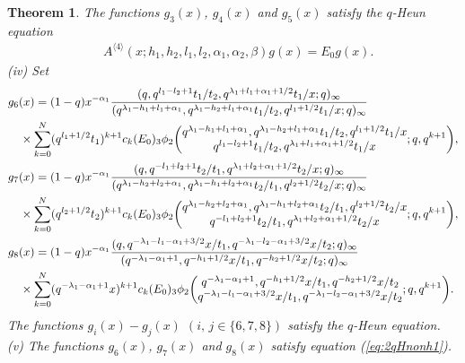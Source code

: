 \documentclass[12pt]{amsart}
\numberwithin{equation}{section}
\newtheorem{thm}{Theorem}[section]
\theoremstyle{definition}
\theoremstyle{remark}
\begin{document}
\begin{thm}
The functions $g_3(x)$,  $g_4(x)$ and $g_5(x)$ satisfy the $q$-Heun equation
  \begin{align*}
    & A^{\langle 4 \rangle} (x; h_{1}, h_{2}, l_{1}, l_{2}, \alpha_{1}, \alpha_{2}, \beta) g(x) = E_0 g(x) . 
  \end{align*}
(iv)
Set 
  \begin{align*}
    &g_{6}(x) = (1 - q)x^{-\alpha_{1}}\frac{(q, q^{l_{1} - l_{2} + 1}t_{1}/t_{2}, q^{ \lambda _{1} + l_{1} +\alpha _{1} + 1/2}t_{1}/x; q)_{\infty}}{(q^{ \lambda _{1} -h_{1} + l_{1} + \alpha _{1} }, q^{ \lambda _{1} -h_{2} + l_{1} + \alpha _{1} }t_{1}/t_{2}, q^{l_{1} + 1/2}t_{1}/x; q)_{\infty}} \\
    &\quad \times \sum_{k = 0}^{N} (q^{l_{1} + 1/2}t_{1})^{k+1} c_k (E_{0}) {}_3\phi_2 \biggl( \begin{array}{@{}c@{}} q^{ \lambda _{1} -h_{1} + l_{1} + \alpha _{1} }, q^{ \lambda _{1} -h_{2} + l_{1} + \alpha _{1} }t_{1}/t_{2}, q^{l_{1} + 1/2}t_{1}/x \\
q^{l_{1} - l_{2} + 1}t_{1}/t_{2}, q^{\lambda _{1} + l_{1} + \alpha _{1} + 1/2}t_{1}/x \end{array} ;q,q^{k+1} \biggr), \\
    &g_{7}(x) = (1 - q)x^{-\alpha_{1}}\frac{(q,q^{- l_{1} + l_{2} + 1}t_{2}/t_{1}, q^{\lambda _{1} + l_{2} + \alpha _{1} + 1/2}t_{2}/x; q)_{\infty}}{(q^{ \lambda _{1} -h_{2} + l_{2} + \alpha _{1} }, q^{ \lambda _{1} -h_{1} + l_{2} + \alpha _{1} }t_{2}/t_{1},  q^{l_{2} + 1/2}t_{2}/x; q)_{\infty}} \\
    &\quad \times \sum_{k = 0}^{N} (q^{l_{2} + 1/2}t_{2})^{k+1}  c_k (E_{0}) {}_3\phi_2 \biggl( \begin{array}{@{}c@{}} q^{ \lambda _{1} -h_{2} + l_{2} + \alpha _{1} }, q^{ \lambda _{1} -h_{1} + l_{2}  + \alpha _{1} }t_{2}/t_{1},  q^{l_{2} + 1/2}t_{2}/x \\
q^{- l_{1} + l_{2} + 1}t_{2}/t_{1}, q^{\lambda _{1} + l_{2} + \alpha _{1} + 1/2}t_{2}/x \end{array} ;q,q^{k+1} \biggr), \\
    &g_{8}(x) = (1 - q)x^{-\alpha_{1}}\frac{(q, q^{- \lambda _{1} -l_{1} - \alpha _{1} + 3/2}x/t_{1}, q^{- \lambda _{1} -l_{2}  - \alpha _{1} + 3/2}x/t_{2} ; q)_{\infty}}{( q^{- \lambda _{1} - \alpha _{1} + 1}, q^{-h_{1} + 1/2}x/t_{1}, q^{-h_{2} + 1/2}x/t_{2}; q)_{\infty}} \\
    &\quad \times \sum_{k = 0}^{N} (q^{- \lambda _{1} - \alpha _{1} + 1}x)^{k+1}  c_k (E_{0}) {}_3\phi_2 \biggl( \begin{array}{@{}c@{}} q^{- \lambda _{1} - \alpha _{1} + 1}, q^{-h_{1} + 1/2}x/t_{1}, q^{-h_{2} + 1/2}x/t_{2} \\
q^{- \lambda _{1} -l_{1} - \alpha _{1} + 3/2}x/t_{1}, q^{- \lambda _{1} -l_{2} - \alpha _{1} + 3/2}x/t_{2} \end{array} ;q,q^{k+1} \biggr).
  \end{align*}
The functions $g_{i} (x)- g_{j} (x)$ $(i, \, j \in \{6, 7, 8\})$ satisfy the $q$-Heun equation.
\\
(v) The functions $g_6(x)$,  $g_7(x)$ and $g_8(x)$ satisfy equation (\ref{eq:2qHnonh1}).
 \end{thm}
\end{document}
